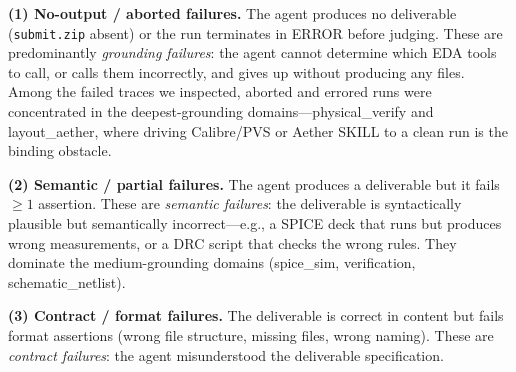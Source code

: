 
\textbf{(1) No-output / aborted failures.} The agent produces no deliverable (\texttt{submit.zip} absent) or the run terminates in ERROR before judging. These are predominantly \emph{grounding failures}: the agent cannot determine which EDA tools to call, or calls them incorrectly, and gives up without producing any files. Among the failed traces we inspected, aborted and errored runs were concentrated in the deepest-grounding domains---physical\_verify and layout\_aether, where driving Calibre/PVS or Aether SKILL to a clean run is the binding obstacle.

\textbf{(2) Semantic / partial failures.} The agent produces a deliverable but it fails $\geq 1$ assertion. These are \emph{semantic failures}: the deliverable is syntactically plausible but semantically incorrect---e.g., a SPICE deck that runs but produces wrong measurements, or a DRC script that checks the wrong rules. They dominate the medium-grounding domains (spice\_sim, verification, schematic\_netlist).

\textbf{(3) Contract / format failures.} The deliverable is correct in content but fails format assertions (wrong file structure, missing files, wrong naming). These are \emph{contract failures}: the agent misunderstood the deliverable specification.


